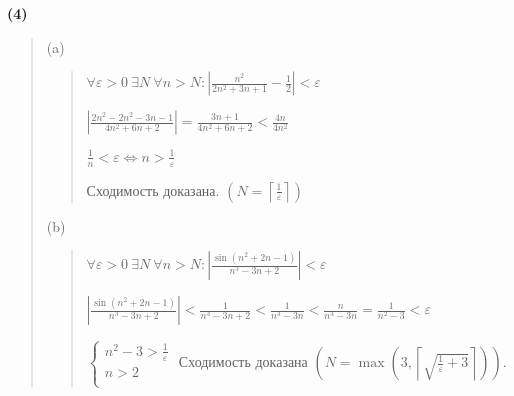\documentclass{article}
\begin{document}
\textbf{\textsf{(4)}}
\begin{quote}
    (a) 
    \begin{quote}
    $\forall \varepsilon > 0 \ \exists N \ \forall n > N: |\frac{n^2}{2n^2 + 3n + 1} - \frac{1}{2}| < \varepsilon$

    $|\frac{2n^2 - 2n^2 - 3n - 1}{4n^2 + 6n + 2}| = \frac{3 n + 1}{4n^2 + 6n + 2} < \frac{4n}{4n^2}$

    $\frac{1}{n} < \varepsilon \Leftrightarrow n > \frac{1}{\varepsilon}$
    
    Сходимость доказана. $(N = \left\lceil{\frac{1}{\varepsilon}}\right\rceil)$ 
    \end{quote}

    (b) 
    \begin{quote}
    $\forall \varepsilon > 0 \ \exists N \ \forall n > N: |\frac{\sin(n^2 + 2n - 1)}{n^3 - 3n + 2}| < \varepsilon$

    $|\frac{\sin(n^2 + 2n - 1)}{n^3 - 3n + 2}| < \frac{1}{n^3 - 3n + 2} < \frac{1}{n^3 - 3n} < \frac{n}{n^3 - 3n} = \frac{1}{n^2 - 3} < \varepsilon$

$
\begin{cases}
    n^2 - 3 > \frac{1}{\varepsilon} \\
    n > 2 \\
\end{cases}
$
    Сходимость доказана $(N = \max (3, \left\lceil{\sqrt{\frac{1}{\varepsilon} + 3}}\right\rceil))$.
    \end{quote}
\end{quote}
\end{document}

